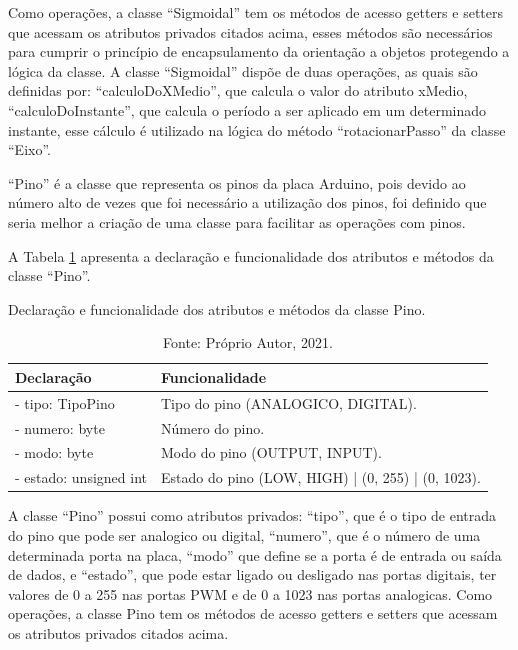 Como operações, a classe “Sigmoidal” tem os métodos de acesso getters e setters que acessam os atributos 
privados citados acima, esses métodos são necessários para cumprir o princípio de encapsulamento da orientação 
a objetos protegendo a lógica da classe. A classe “Sigmoidal” dispõe de duas operações, as quais são definidas 
por: “calculoDoXMedio”, que calcula o valor do atributo xMedio, “calculoDoInstante”, que calcula o período a 
ser aplicado em um determinado instante, esse cálculo é utilizado na lógica do método “rotacionarPasso” 
da classe “Eixo”.

“Pino” é a classe que representa os pinos da placa Arduino, pois devido ao número alto de vezes que foi 
necessário a utilização dos pinos, foi definido que seria melhor a criação de uma classe para facilitar 
as operações com pinos. 

A Tabela \ref{tab:classepino} apresenta a declaração e funcionalidade dos atributos e métodos da 
classe “Pino”.

\begin{table}[!htb]
    \centering
    \caption{Declaração e funcionalidade dos atributos e métodos da classe Pino.}
    \begin{tabular}{lp{9cm}}
        \hline
        \textbf{Declaração} & \textbf{Funcionalidade}\\
        \hline
        - tipo: TipoPino & Tipo do pino (ANALOGICO, DIGITAL).\\
        - numero: byte & Número do pino.\\
        - modo: byte & Modo do pino (OUTPUT, INPUT).\\
        - estado: unsigned int & Estado do pino (LOW, HIGH) | (0, 255) | (0, 1023).\\
        \hline       
    \end{tabular}
    \caption*{Fonte: Próprio Autor, 2021.}
    \label{tab:classepino}
\end{table}

A classe “Pino” possui como atributos privados: “tipo”, que é o tipo de entrada do pino que pode ser 
analogico ou digital, “numero”, que é o número de uma determinada porta na placa, “modo” que define se 
a porta é de entrada ou saída de dados, e “estado”, que pode estar ligado ou desligado nas portas digitais, 
ter valores de 0 a 255 nas portas PWM e de 0 a 1023 nas portas analogicas. Como operações, a classe Pino 
tem os métodos de acesso getters e setters que acessam os atributos privados citados acima.

